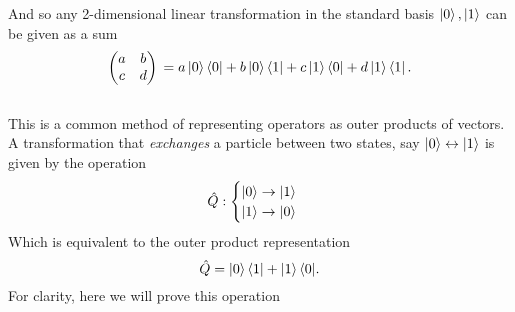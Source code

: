 And so any 2-dimensional linear transformation in the standard basis $\ket{0}, \ket{1}$ can be given as a sum
\begin{equation}
\begin{pmatrix}
  a & b  \\
  c & d 
  \end{pmatrix} \\
= a \ket{0} \langle 0| + b \ket{0} \bra{1} + c \ket{1} \bra{0} + d\ket{1} \bra{1}.
\end{equation}
\\
This is a common method of representing operators as outer products of vectors.
A transformation that \emph{exchanges} a particle between two states, say $\ket{0} \leftrightarrow \ket{1}$ is given by the operation 
$$ \hat{Q}: \begin{cases} \ket{0} \rightarrow \ket{1} \\ \ket{1} \rightarrow \ket{0} \end{cases} $$
Which is equivalent to the outer product representation
$$ \hat{Q} = \ket{0} \bra{1} + \ket{1} \langle0|. $$
For clarity, here we will prove this operation


